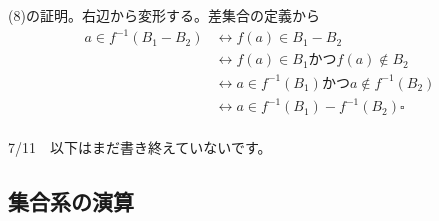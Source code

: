 \documentclass[a4j,dvipdfmx]{jsarticle}
\begin{document}
(8)の証明。右辺から変形する。差集合の定義から
\begin{align*}
    a \in f^{-1}(B_1-B_2)
    &\leftrightarrow f(a)\in B_1-B_2 \\
    &\leftrightarrow f(a)\in B_1かつf(a)\notin B_2\\
    &\leftrightarrow a\in f^{-1}(B_1)かつa\notin f^{-1}(B_2)\\
    &\leftrightarrow a\in f^{-1}(B_1)-f^{-1}(B_2)\square
\end{align*}
\color{black}
\hrulefill\\
7/11　以下はまだ書き終えていないです。
\newpage
\subsection{集合系の演算}
\end{document}
